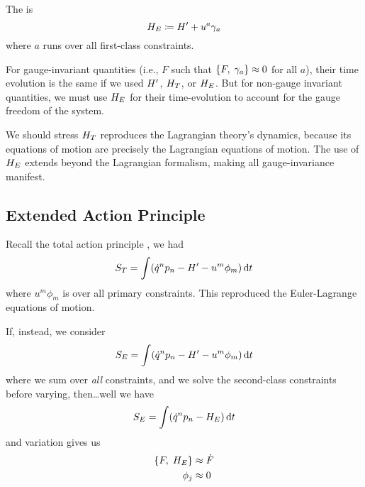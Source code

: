 \begin{definition}\label{defn:extended-hamiltonian}
The  is 
\begin{equation*}
H_{E}\coloneqq H'+u^{a}\gamma_{a}
\end{equation*}
where $a$ runs over all first-class constraints.
\end{definition}

For gauge-invariant quantities (i.e., $F$ such that
$\left\{F,\;\gamma_{a}\right\}\approx0$ for all $a$),
their time evolution is the same if we used $H'$,
$H_{T}$, or $H_{E}$. But for non-gauge
invariant quantities, we must use $H_{E}$ for their
time-evolution to account for the gauge freedom of the system.

\M
We should stress $H_{T}$ reproduces the Lagrangian theory's
dynamics, because its equations of motion are precisely the Lagrangian
equations of motion. The use of $H_{E}$ extends beyond
the Lagrangian formalism, making all gauge-invariance manifest.

\subsection{Extended Action Principle}

\M
Recall the total action principle , we had
\begin{equation*}
S_{T} = \int(\dot{q}^{n}p_{n} - H' - u^{m}\phi_{m})\,\mathrm{d} t
\end{equation*}
where $u^{m}\phi_{m}$ is over all primary constraints. This reproduced
the Euler-Lagrange equations of motion.

\M
If, instead, we consider
\begin{equation}
S_{E} = \int(\dot{q}^{n}p_{n} - H' - u^{m}\phi_{m})\,\mathrm{d} t
\end{equation}
where we sum over \emph{all} constraints, and we solve the second-class
constraints before varying, then\dots well we have
\begin{equation}
S_{E} = \int(\dot{q}^{n}p_{n} - H_{E})\,\mathrm{d} t
\end{equation}
and variation gives us
\begin{subequations}
\begin{align}
\left\{F,\;H_{E}\right\}&\approx\dot{F}\\
\phi_{j}&\approx0
\end{align}
\end{subequations}

